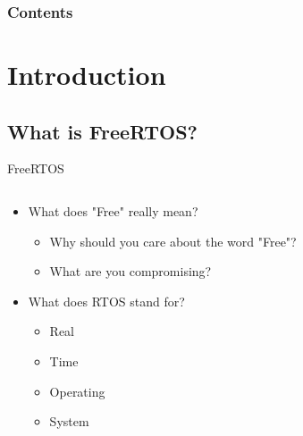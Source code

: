 \documentclass[10pt]{beamer}
\title[Universidad Panamericana]{}
\subtitle{Introduction to FreeRTOS}
\author[]{Name}
\institute[ltonix@up.edu.mx]{Universidad Panamericana}
\date[Presentation \today]{Presentation \today}
\begin{document}
\frame{\titlepage}
\begin{frame}
\frametitle{Contents}
\tableofcontents
\end{frame}

\section{Introduction}
\subsection{What is FreeRTOS?}
\begin{frame}{FreeRTOS}
    \begin{columns}
    \begin{column}{0.6\textwidth}
      \begin{itemize}
        \item What does "Free" really mean?
            \begin{itemize}
                \item Why should you care about the word "Free"?
                \item What are you compromising?
            \end{itemize}
        \item What does RTOS stand for?
            \begin{itemize}
                \item Real
                \item Time
                \item Operating
                \item System
            \end{itemize}
      \end{itemize}
    \end{column}
    

\end{columns}
\end{frame}
\end{document}
